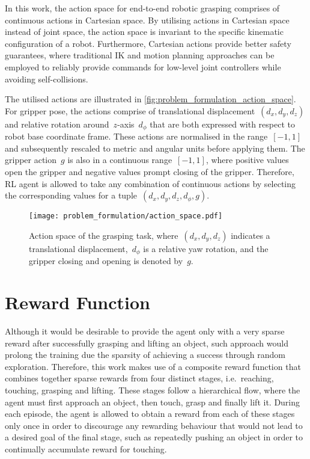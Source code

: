 In this work, the action space for end-to-end robotic grasping comprises of continuous actions in Cartesian space. By utilising actions in Cartesian space instead of joint space, the action space is invariant to the specific kinematic configuration of a robot. Furthermore, Cartesian actions provide better safety guarantees, where traditional IK and motion planning approaches can be employed to reliably provide commands for low-level joint controllers while avoiding self-collisions.

The utilised actions are illustrated in \autoref{fig:problem_formulation_action_space}. For gripper pose, the actions comprise of translational displacement~\((d_{x},d_{y},d_{z})\) and relative rotation around~\(z\)-axis~\(d_{\phi}\) that are both expressed with respect to robot base coordinate frame. These actions are normalised in the range~\([-1, 1]\) and subsequently rescaled to metric and angular units before applying them. The gripper action~\(g\) is also in a continuous range~\([-1, 1]\), where positive values open the gripper and negative values prompt closing of the gripper. Therefore, RL agent is allowed to take any combination of continuous actions by selecting the corresponding values for a tuple~\((d_{x},d_{y},d_{z},d_{\phi},g)\).

\begin{figure}[ht]
    \centering
    \texttt{[image: problem\_formulation/action\_space.pdf]}
    \caption{Action space of the grasping task, where~\((d_{x},d_{y},d_{z})\) indicates a translational displacement,~\(d_{\phi}\) is a relative yaw rotation, and the gripper closing and opening is denoted by~\(g\).}
    \label{fig:problem_formulation_action_space}
\end{figure}


\section{Reward Function}

Although it would be desirable to provide the agent only with a very sparse reward after successfully grasping and lifting an object, such approach would prolong the training due the sparsity of achieving a success through random exploration. Therefore, this work makes use of a composite reward function that combines together sparse rewards from four distinct stages, i.e.~reaching, touching, grasping and lifting. These stages follow a hierarchical flow, where the agent must first approach an object, then touch, grasp and finally lift it. During each episode, the agent is allowed to obtain a reward from each of these stages only once in order to discourage any rewarding behaviour that would not lead to a desired goal of the final stage, such as repeatedly pushing an object in order to continually accumulate reward for touching.

